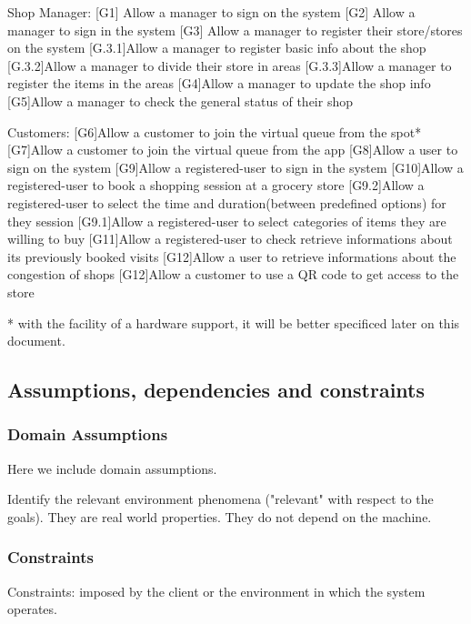 Shop Manager:
[G1] Allow a manager to sign on the system
[G2] Allow a manager to sign in the system
[G3] Allow a manager to register their store/stores on the system
    [G.3.1]Allow a manager to register basic info about the shop
	[G.3.2]Allow a manager to divide their store in areas 
	[G.3.3]Allow a manager to register the items in the areas 
[G4]Allow a manager to update the shop info
[G5]Allow a manager to check the general status of their shop

Customers:
[G6]Allow a customer to join the virtual queue from the spot*
[G7]Allow a customer to join the virtual queue from the app
[G8]Allow a user to sign on the system
[G9]Allow a registered-user to sign in the system
[G10]Allow a registered-user to book a shopping session at a grocery store
    [G9.2]Allow a registered-user to select the time and duration(between 		predefined options) for they session 	
    [G9.1]Allow a registered-user to select categories of items they are 	willing to 
    buy
[G11]Allow a registered-user to check retrieve informations about its previously booked visits
[G12]Allow a user to retrieve informations about the congestion of shops
[G12]Allow a customer to use a QR code to get access to the store 


* with the facility of a hardware support, it will be better specificed later on this document.

\subsection{Assumptions, dependencies and constraints}
\label{subsect:assumptionsdependenciescostraints}

\subsubsection{Domain Assumptions}
\label{subsubsect:domainassumptions}

Here we include domain assumptions.

Identify the relevant environment phenomena ("relevant" with respect to the goals). They are real world properties. They do not depend on the machine.

\subsubsection{Constraints}
\label{subsubsect:contraints}

Constraints: imposed by the client or the environment in which the system operates. 


